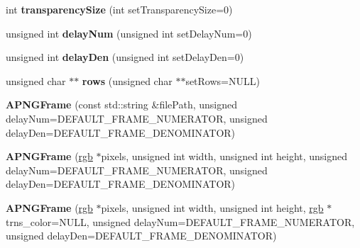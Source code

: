 \begin{DoxyCompactItemize}
\item 
\hypertarget{classapngasm_1_1APNGFrame_adb569119e5de304fd914a426b8eb8344}{int {\bfseries transparency\-Size} (int set\-Transparency\-Size=0)}\label{classapngasm_1_1APNGFrame_adb569119e5de304fd914a426b8eb8344}

\item 
\hypertarget{classapngasm_1_1APNGFrame_a43419897a5e90845a9b861b1bc2b0a00}{unsigned int {\bfseries delay\-Num} (unsigned int set\-Delay\-Num=0)}\label{classapngasm_1_1APNGFrame_a43419897a5e90845a9b861b1bc2b0a00}

\item 
\hypertarget{classapngasm_1_1APNGFrame_a10536e9d54229720b5bce2d61547a1b0}{unsigned int {\bfseries delay\-Den} (unsigned int set\-Delay\-Den=0)}\label{classapngasm_1_1APNGFrame_a10536e9d54229720b5bce2d61547a1b0}

\item 
\hypertarget{classapngasm_1_1APNGFrame_a690460ddd31f4b2a199153ba850b6f6f}{unsigned char $\ast$$\ast$ {\bfseries rows} (unsigned char $\ast$$\ast$set\-Rows=N\-U\-L\-L)}\label{classapngasm_1_1APNGFrame_a690460ddd31f4b2a199153ba850b6f6f}

\item 
\hypertarget{classapngasm_1_1APNGFrame_a258b93f5179fab0e04af0ed0697f2893}{{\bfseries A\-P\-N\-G\-Frame} (const std\-::string \&file\-Path, unsigned delay\-Num=D\-E\-F\-A\-U\-L\-T\-\_\-\-F\-R\-A\-M\-E\-\_\-\-N\-U\-M\-E\-R\-A\-T\-O\-R, unsigned delay\-Den=D\-E\-F\-A\-U\-L\-T\-\_\-\-F\-R\-A\-M\-E\-\_\-\-D\-E\-N\-O\-M\-I\-N\-A\-T\-O\-R)}\label{classapngasm_1_1APNGFrame_a258b93f5179fab0e04af0ed0697f2893}

\item 
\hypertarget{classapngasm_1_1APNGFrame_afd794300a428dc7c60686cfc92d9356a}{{\bfseries A\-P\-N\-G\-Frame} (\hyperlink{structapngasm_1_1rgb}{rgb} $\ast$pixels, unsigned int width, unsigned int height, unsigned delay\-Num=D\-E\-F\-A\-U\-L\-T\-\_\-\-F\-R\-A\-M\-E\-\_\-\-N\-U\-M\-E\-R\-A\-T\-O\-R, unsigned delay\-Den=D\-E\-F\-A\-U\-L\-T\-\_\-\-F\-R\-A\-M\-E\-\_\-\-D\-E\-N\-O\-M\-I\-N\-A\-T\-O\-R)}\label{classapngasm_1_1APNGFrame_afd794300a428dc7c60686cfc92d9356a}

\item 
\hypertarget{classapngasm_1_1APNGFrame_a5d273fea8e908606a01f252a5ea19cdb}{{\bfseries A\-P\-N\-G\-Frame} (\hyperlink{structapngasm_1_1rgb}{rgb} $\ast$pixels, unsigned int width, unsigned int height, \hyperlink{structapngasm_1_1rgb}{rgb} $\ast$trns\-\_\-color=N\-U\-L\-L, unsigned delay\-Num=D\-E\-F\-A\-U\-L\-T\-\_\-\-F\-R\-A\-M\-E\-\_\-\-N\-U\-M\-E\-R\-A\-T\-O\-R, unsigned delay\-Den=D\-E\-F\-A\-U\-L\-T\-\_\-\-F\-R\-A\-M\-E\-\_\-\-D\-E\-N\-O\-M\-I\-N\-A\-T\-O\-R)}\label{classapngasm_1_1APNGFrame_a5d273fea8e908606a01f252a5ea19cdb}


\end{DoxyCompactItemize}
